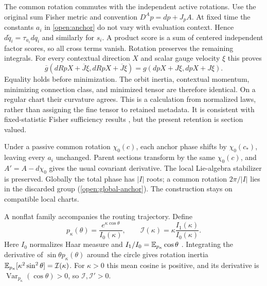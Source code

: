 The common rotation commutes with the independent active rotations. Use the original sum Fisher metric and convention $D^A p=dp+J_pA$. At fixed time the constants $a_i$ in \cref{open:anchor} do not vary with evaluation context. Hence $d\widetilde q_i=\tau_{a_i}dq_i$ and similarly for $s_i$. A product score is a sum of centered independent factor scores, so all cross terms vanish. Rotation preserves the remaining integrals. For every contextual direction $X$ and scalar gauge velocity $\xi$ this proves
\begin{equation}
\overline g(dRpX+\overline J\xi,dRpX+\overline J\xi)
=g(dpX+J\xi,dpX+J\xi).
\label{open:cost-equality}
\end{equation}
Equality holds before minimization. The orbit inertia, contextual momentum, minimizing connection class, and minimized tensor are therefore identical. On a regular chart their curvature agrees. This is a calculation from normalized laws, rather than assigning the fine tensor to retained metadata. It is consistent with fixed-statistic Fisher sufficiency results \citep{AyJostLeSchwachhofer2015}, but the present retention is section valued.

Under a passive common rotation $\chi_0(c)$, each anchor phase shifts by $\chi_0(c_*)$, leaving every $a_i$ unchanged. Parent sections transform by the same $\chi_0(c)$, and $A'=A-d\chi_0$ gives the usual covariant derivative. The local Lie-algebra stabilizer is preserved. Globally the total phase has $|I|$ roots; a common rotation $2\pi/|I|$ lies in the discarded group (\cref{open:global-anchor}). The construction stays on compatible local charts.

A nonflat family accompanies the routing trajectory. Define
\begin{equation}
p_\kappa(\theta)=\frac{e^{\kappa\cos\theta}}{I_0(\kappa)},
\qquad
\mathcal I(\kappa)=\kappa\frac{I_1(\kappa)}{I_0(\kappa)}.
\end{equation}
Here $I_0$ normalizes Haar measure and $I_1/I_0=\mathbb E_{p_\kappa}\cos\theta$ \citep{MardiaJupp2000}.
Integrating the derivative of $\sin\theta p_\kappa(\theta)$ around the circle gives rotation inertia
$\mathbb E_{p_\kappa}[\kappa^2\sin^2\theta]=\mathcal I(\kappa)$.
For $\kappa>0$ this mean cosine is positive, and its derivative is
$\operatorname{Var}_{p_\kappa}(\cos\theta)>0$, so $\mathcal I,\mathcal I'>0$.

